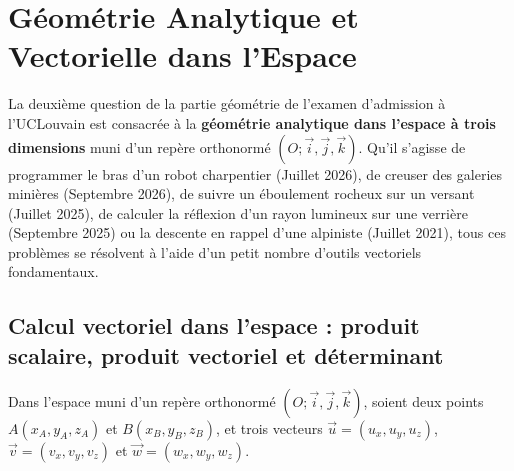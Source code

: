 \chapter[Géométrie Analytique dans l'Espace]{Géométrie Analytique et Vectorielle dans l'Espace}

La deuxième question de la partie géométrie de l'examen d'admission à l'UCLouvain est consacrée à la \textbf{géométrie analytique dans l'espace à trois dimensions} muni d'un repère orthonormé $(O;\vec{i},\vec{j},\vec{k})$. Qu'il s'agisse de programmer le bras d'un robot charpentier (Juillet 2026), de creuser des galeries minières (Septembre 2026), de suivre un éboulement rocheux sur un versant (Juillet 2025), de calculer la réflexion d'un rayon lumineux sur une verrière (Septembre 2025) ou la descente en rappel d'une alpiniste (Juillet 2021), tous ces problèmes se résolvent à l'aide d'un petit nombre d'outils vectoriels fondamentaux.

\section{Calcul vectoriel dans l'espace : produit scalaire, produit vectoriel et déterminant}

Dans l'espace muni d'un repère orthonormé $(O;\vec{i},\vec{j},\vec{k})$, soient deux points $A(x_A, y_A, z_A)$ et $B(x_B, y_B, z_B)$, et trois vecteurs $\vec{u} = (u_x, u_y, u_z)$, $\vec{v} = (v_x, v_y, v_z)$ et $\vec{w} = (w_x, w_y, w_z)$.

